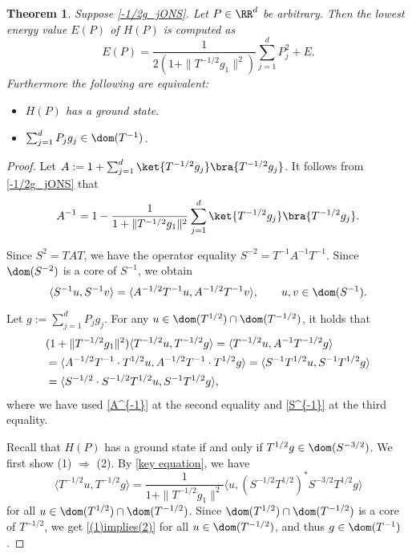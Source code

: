 \documentclass[12pt,draft]{article}
\theoremstyle{plain}
\newtheorem{thm}[theorem]{\bf Theorem}
\numberwithin{equation}{section}
\theoremstyle{remark}
\begin{document}
\begin{thm}
Suppose \eqref{-1/2g_jONS}.
Let $P\in\RR^d$ be arbitrary.
Then the lowest energy value $E(P)$ of $H(P)$ is computed as
\[
E(P) = \frac{1}{2(1+\|T^{-1/2}g_1\|^2)}\sum_{j=1}^dP_j^2 + E.
\]
Furthermore the following are equivalent:
\begin{itemize}{}{}
\item[(1)] $H(P)$ has a ground state.
\item[(2)] $\sum_{j=1}^d P_jg_j\in\dom(T^{-1})$.
\end{itemize}
\end{thm}

\begin{proof}
Let $A:=1+\sum_{j=1}^d\ket{T^{-1/2}g_j}\bra{T^{-1/2}g_j}$.
It follows from \eqref{-1/2g_jONS} that
\begin{equation}\label{A^{-1}}
A^{-1} = 1-\frac{1}{1+\|T^{-1/2}g_1\|^2}\sum_{j=1}^d\ket{T^{-1/2}g_j}\bra{T^{-1/2}g_j}.
\end{equation}

Since $S^2 = TAT$, we have the operator equality $S^{-2}=T^{-1}A^{-1}T^{-1}$.
Since $\dom(S^{-2})$ is a core of $S^{-1}$, we obtain
\begin{equation}\label{S^{-1}}
\langle S^{-1}u,S^{-1}v\rangle = \langle A^{-1/2}T^{-1}u,A^{-1/2}T^{-1}v\rangle, \qquad u,v\in \dom(S^{-1}).
\end{equation}

Let $g:=\sum_{j=1}^dP_jg_j$.
For any $u\in\dom(T^{1/2})\cap\dom(T^{-1/2})$, it holds that
\begin{align}\label{key equation}
&(1+\|T^{-1/2}g_1\|^2)\langle T^{-1/2}u,T^{-1/2}g\rangle 
= \langle T^{-1/2}u,A^{-1}T^{-1/2}g\rangle\notag\\
&= \langle A^{-1/2}T^{-1}\cdot T^{1/2}u,A^{-1/2}T^{-1}\cdot T^{1/2}g\rangle
= \langle S^{-1}T^{1/2}u,S^{-1}T^{1/2}g\rangle\notag\\
&= \langle S^{-1/2}\cdot S^{-1/2}T^{1/2}u,S^{-1}T^{1/2}g\rangle,
\end{align}
where we have used \eqref{A^{-1}} at the second equality and \eqref{S^{-1}} at the third equality.

Recall that $H(P)$ has a ground state if and only if $T^{1/2}g\in\dom(S^{-3/2})$.
We first show (1) $\Rightarrow$ (2).
By \eqref{key equation}, we have
\begin{equation}\label{(1)implies(2)}
\langle T^{-1/2}u,T^{-1/2}g\rangle = \frac{1}{1+\|T^{-1/2}g_1\|^2}\langle u,\left(S^{-1/2}T^{1/2}\right)^*S^{-3/2}T^{1/2}g\rangle
\end{equation}
for all $u\in\dom(T^{1/2})\cap\dom(T^{-1/2})$.
Since $\dom(T^{1/2})\cap\dom(T^{-1/2})$ is a core of $T^{-1/2}$, we get \eqref{(1)implies(2)} for all $u\in\dom(T^{-1/2})$, 
and thus $g\in\dom(T^{-1})$.


\end{proof}
\end{document}
